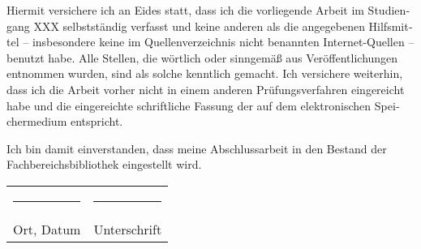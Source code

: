 \documentclass[
	12pt,
	a4paper,
	BCOR10mm,
	DIV14,
	headsepline,
]{scrreprt}
\begin{document}
\begin{otherlanguage}{ngerman}
Hiermit versichere ich an Eides statt, dass ich die vorliegende Arbeit im Studiengang XXX selbstständig verfasst und keine anderen als die angegebenen Hilfsmittel -- insbesondere keine im Quellenverzeichnis nicht benannten Internet-Quellen -- benutzt habe.
Alle Stellen, die wörtlich oder sinngemäß aus Veröffentlichungen entnommen wurden, sind als solche kenntlich gemacht.
Ich versichere weiterhin, dass ich die Arbeit vorher nicht in einem anderen Prüfungsverfahren eingereicht habe und die eingereichte schriftliche Fassung der auf dem elektronischen Speichermedium entspricht.

\bigskip

\noindent
Ich bin damit einverstanden, dass meine Abschlussarbeit in den Bestand der Fachbereichsbibliothek eingestellt wird.
\end{otherlanguage}

\bigskip
\bigskip
\bigskip

\begin{center}
\begin{tabular}{ll}
	\rule{0.35\textwidth}{0.4pt} & \rule{0.55\textwidth}{0.4pt} \\
	Ort, Datum & Unterschrift
\end{tabular}
\end{center}
\end{document}
